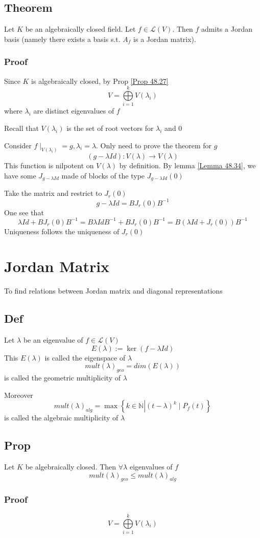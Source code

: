 \documentclass{book}
\begin{document}
\section{Theorem}
Let $K$ be an algebraically closed field. Let $f\in \mathscr{L}(V)$. Then  $f$ admits a Jordan basis (namely there exists a basis s.t. $A_f$ is a Jordan matrix). 
\subsection*{Proof}
Since $K$ is algebraically closed, by Prop \ref{Prop 48.27}
$$V=\bigoplus\limits_{i=1}^kV(\lambda_i)$$
where $\lambda_i$ are distinct eigenvalues of $f$

Recall that $V(\lambda_i)$ is the set of root vectors for $\lambda_i$ and 0

Consider $f\mid_{V(\lambda_i)}=g,\lambda_i=\lambda$. Only need to prove the theorem for $g$ $$(g-\lambda Id):V(\lambda)\rightarrow V(\lambda)$$
This function is nilpotent on $V(\lambda)$ by definition. By lemma \ref{Lemma 48.34}, we have some $J_{g-\lambda Id}$ made of blocks of the type $J_{g-\lambda Id}(0)$

Take the matrix and restrict to $J_r(0)$$$g-\lambda Id=BJ_r(0)B^{-1}$$
One see that
$$\lambda Id+BJ_r(0)B^{-1}=B\lambda IdB^{-1}+BJ_r(0)B^{-1}=B(\lambda Id+J_r(0))B^{-1}$$
Uniqueness follows the uniqueness of $J_r(0)$
\chapter{Jordan Matrix}
To find relations between Jordan matrix and diagonal representations
\section{Def}
Let $\lambda$ be an eigenvalue of $f\in \mathscr{L}(V)$
$$E(\lambda):=\ker (f-\lambda Id)$$
This $E(\lambda)$ is called the eigenspace of $\lambda$
$$mult(\lambda)_{geo}=dim(E(\lambda))$$
is called the geometric multiplicity of $\lambda$

Moreover
$$mult(\lambda)_{alg}=\max\left\{k\in \mathbb{N}\left| (t-\lambda)^k\mid P_f(t)\right.\right\}$$
is called the algebraic multiplicity of $\lambda$
\section{Prop}
Let $K$ be algebraically closed. Then $\forall \lambda$ eigenvalues of $f$
$$mult(\lambda)_{geo}\leq mult(\lambda)_{alg}$$
\subsection*{Proof}
$$V=\bigoplus\limits_{i=1}^kV(\lambda_i)$$
\end{document}
